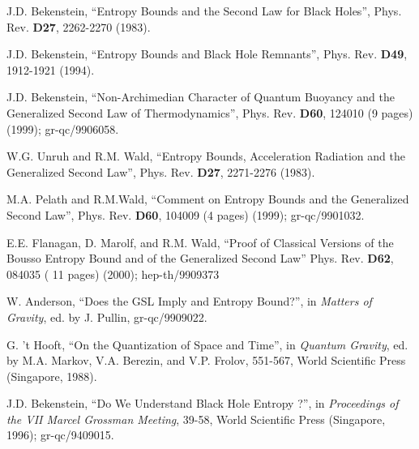 \begin{thebibliography}{999}
 J.D. Bekenstein, ``Entropy Bounds and
the Second Law for Black Holes'', Phys. Rev. {\bf D27}, 2262-2270
(1983).  

 J.D. Bekenstein, ``Entropy Bounds and
Black Hole Remnants'', Phys. Rev. {\bf D49}, 1912-1921 (1994).

 J.D. Bekenstein, ``Non-Archimedian
Character of Quantum Buoyancy and the Generalized Second Law of
Thermodynamics'', Phys. Rev. {\bf D60}, 124010 (9 pages) (1999);
gr-qc/9906058.  

 W.G. Unruh and R.M. Wald, ``Entropy
Bounds, Acceleration Radiation and the Generalized Second Law'',
Phys. Rev. {\bf D27}, 2271-2276 (1983). 

 M.A. Pelath and R.M.Wald, ``Comment on
Entropy Bounds and the Generalized Second Law'', Phys. Rev. {\bf D60},
104009 (4 pages) (1999); gr-qc/9901032. 

 E.E. Flanagan, D. Marolf, and R.M. Wald,
``Proof of Classical Versions of the Bousso Entropy Bound and of the
Generalized Second Law'' Phys. Rev. {\bf D62}, 084035 ( 11 pages)
(2000); hep-th/9909373 

 W. Anderson, ``Does the GSL Imply and
Entropy Bound?'', in {\it Matters of Gravity}, ed. by J. Pullin,
gr-qc/9909022.  

 G. 't Hooft, ``On the Quantization of
Space and Time'', in {\it Quantum Gravity}, ed. by M.A. Markov,
V.A. Berezin, and V.P. Frolov, 551-567, World Scientific Press
(Singapore, 1988).  

 J.D. Bekenstein, ``Do We Understand Black
Hole Entropy ?'', in {\it Proceedings of the VII Marcel Grossman
Meeting}, 39-58, World Scientific Press (Singapore, 1996); gr-qc/9409015.


\end{thebibliography}
